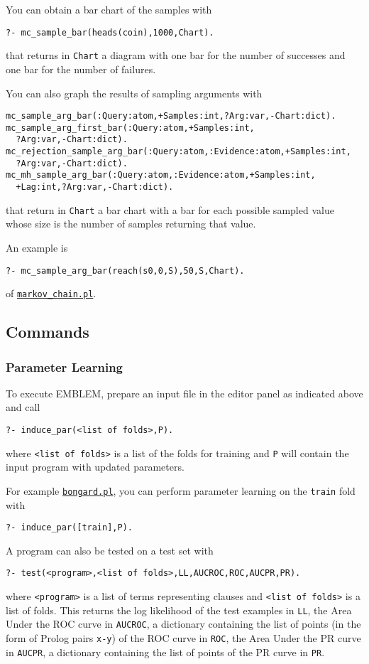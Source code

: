 \documentclass[a4paper,10pt]{scrartcl}
\begin{document}
You can obtain a bar chart of the samples with
\begin{verbatim}
?- mc_sample_bar(heads(coin),1000,Chart).
\end{verbatim}
that returns in \verb|Chart| a diagram with one bar for the number of successes and 
one bar for the number of failures.

You can also graph the results of sampling arguments with
\begin{verbatim}
mc_sample_arg_bar(:Query:atom,+Samples:int,?Arg:var,-Chart:dict).
mc_sample_arg_first_bar(:Query:atom,+Samples:int,
  ?Arg:var,-Chart:dict).
mc_rejection_sample_arg_bar(:Query:atom,:Evidence:atom,+Samples:int,
  ?Arg:var,-Chart:dict).
mc_mh_sample_arg_bar(:Query:atom,:Evidence:atom,+Samples:int,
  +Lag:int,?Arg:var,-Chart:dict).
\end{verbatim} 
that return in \verb|Chart| a bar chart with a bar for each possible sampled value whose size is the number of samples
returning that value.

An example is
\begin{verbatim}
?- mc_sample_arg_bar(reach(s0,0,S),50,S,Chart). 
\end{verbatim}
of \href{http://cplint.lamping.unife.it/example/inference/markov_chain.pl}{\texttt{markov\_chain.pl}}.





\subsection{Commands}
\subsubsection{Parameter Learning}
To execute EMBLEM, prepare an input file in the editor panel as indicated above 
and call
\begin{verbatim}
?- induce_par(<list of folds>,P).
\end{verbatim}
where \verb|<list of folds>| is a list of the folds for training and
\verb|P| will contain the input program with updated parameters.

For example \href{http://cplint.lamping.unife.it/example/bongard.pl}{\texttt{bongard.pl}}, you can 
perform parameter learning on the \verb|train| fold with 
\begin{verbatim}
?- induce_par([train],P).
\end{verbatim}
A program can also be tested on a test set with
\begin{verbatim}
?- test(<program>,<list of folds>,LL,AUCROC,ROC,AUCPR,PR).
\end{verbatim}
where \verb|<program>| is a list of terms representing clauses and
\verb|<list of folds>| is a list of folds.
This returns the log likelihood of the test examples in \verb|LL|, the Area Under the ROC curve in \verb|AUCROC|, a dictionary containing the list of points (in the form of Prolog pairs \verb|x-y|) of the ROC curve in \verb|ROC|,
the Area Under the PR curve in \verb|AUCPR|, a dictionary containing the list of points of the PR curve in \verb|PR|.
\end{document}
